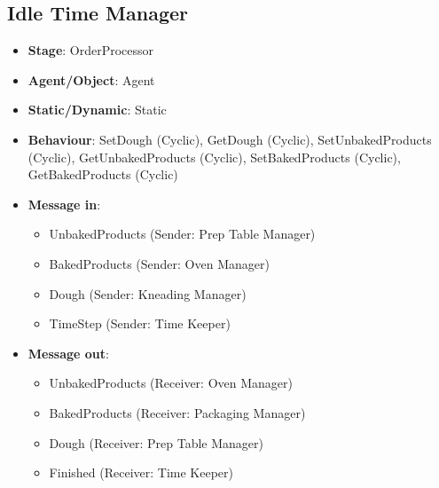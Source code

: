 \documentclass[12pt]{article}
\begin{document}
\subsection{Idle Time Manager}%
\label{sub:idle_manager}
\begin{itemize}
    \item \textbf{Stage}: OrderProcessor
    \item \textbf{Agent/Object}: Agent
    \item \textbf{Static/Dynamic}: Static
    \item \textbf{Behaviour}: SetDough (Cyclic), GetDough (Cyclic), SetUnbakedProducts (Cyclic), GetUnbakedProducts (Cyclic), SetBakedProducts (Cyclic), GetBakedProducts (Cyclic)
    \item \textbf{Message in}:
        \begin{itemize}
            \item UnbakedProducts (Sender: Prep Table Manager)
            \item BakedProducts (Sender: Oven Manager)
            \item Dough (Sender: Kneading Manager)
            \item TimeStep (Sender: Time Keeper)
        \end{itemize}
    \item \textbf{Message out}:
        \begin{itemize}
            \item UnbakedProducts (Receiver: Oven Manager)
            \item BakedProducts   (Receiver: Packaging Manager)
            \item Dough           (Receiver: Prep Table Manager)
            \item Finished (Receiver: Time Keeper)
        \end{itemize}
\end{itemize}
\end{document}
